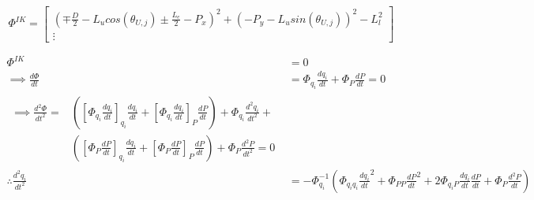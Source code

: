\begin{equation}
    \Phi^{IK}=
    \begin{bmatrix}
     (\mp \frac{D}{2}-L_u cos(\theta_{U,j})\pm\frac{L_e}{2}-P_x)^2+(-P_y-L_u sin(\theta_{U,j}))^2-L_l^2 \\
         \vdots
    \end{bmatrix}
\end{equation}

\begin{align}
\Phi^{IK} &= 0  \nonumber \\
\implies \tfrac{d\Phi}{dt} &=\Phi_{q_i} \tfrac{dq_i}{dt}+\Phi_{P} \tfrac{dP}{dt}  =0\\
\begin{split}
\implies 
\tfrac{d^2\Phi}{dt^2} =&([\Phi_{q_i}\tfrac{dq_i}{dt}]_{q_i}\tfrac{dq_i}{dt}+[\Phi_{q_i}\tfrac{dq_i}{dt}]_{P}\tfrac{dP}{dt})+\Phi_{q_i}\tfrac{d^2q_i}{dt^2}+\\
                           &([\Phi_{P}\tfrac{dP}{dt}]_{q_i}\tfrac{dq_i}{dt}+[\Phi_{P}\tfrac{dP}{dt}]_{P}\tfrac{dP}{dt})+\Phi_{P}\tfrac{d^2P}{dt^2}=0
\end{split}\\
\therefore  \tfrac{d^2q_i}{dt^2}&=-\Phi_{q_i}^{-1} (\Phi_{q_iq_i}\tfrac{dq_i}{dt}^2+\Phi_{PP}\tfrac{dP}{dt}^2+2\Phi_{q_iP}\tfrac{dq_i}{dt}\tfrac{dP}{dt}+\Phi_P\tfrac{d^2P}{dt}) 
\end{align}



